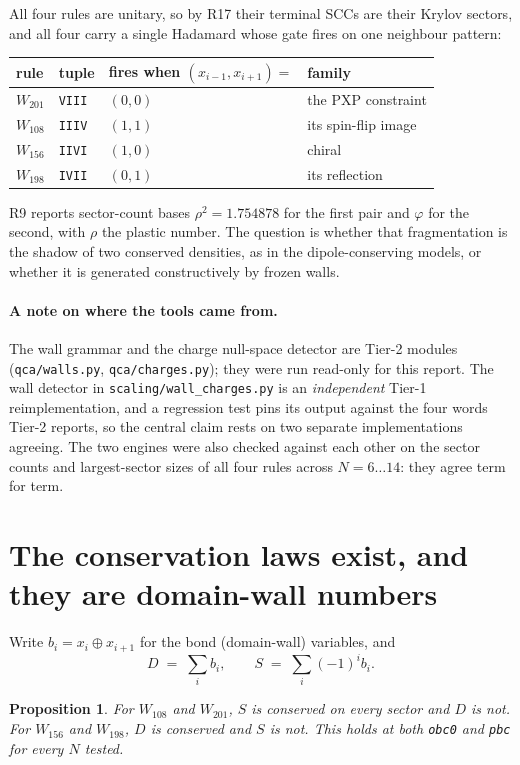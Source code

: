 \documentclass[11pt]{article}
\newcommand{\rt}[1]{\texttt{#1}}
\newcommand{\fn}[1]{\texttt{#1}}
\theoremstyle{plain}
\newtheorem{proposition}{Proposition}
\begin{document}
All four rules are unitary, so by R17 their terminal SCCs are their Krylov
sectors, and all four carry a single Hadamard whose gate fires on one neighbour
pattern:
\begin{center}
\begin{tabular}{llll}
\toprule
rule & tuple & fires when $(x_{i-1},x_{i+1})=$ & family \\
\midrule
$W_{201}$ & \rt{VIII} & $(0,0)$ & the PXP constraint \\
$W_{108}$ & \rt{IIIV} & $(1,1)$ & its spin-flip image \\
$W_{156}$ & \rt{IIVI} & $(1,0)$ & chiral \\
$W_{198}$ & \rt{IVII} & $(0,1)$ & its reflection \\
\bottomrule
\end{tabular}
\end{center}

\noindent R9 reports sector-count bases $\rho^2=1.754878$ for the first pair and
$\varphi$ for the second, with $\rho$ the plastic number. The question is whether
that fragmentation is the shadow of two conserved densities, as in the
dipole-conserving models, or whether it is generated constructively by frozen
walls.

\paragraph{A note on where the tools came from.} The wall grammar and the
charge null-space detector are Tier-2 modules (\fn{qca/walls.py},
\fn{qca/charges.py}); they were run read-only for this report. The wall detector
in \fn{scaling/wall\_charges.py} is an \emph{independent} Tier-1
reimplementation, and a regression test pins its output against the four words
Tier-2 reports, so the central claim rests on two separate implementations
agreeing. The two engines were also checked against each other on the sector
counts and largest-sector sizes of all four rules across $N=6\ldots14$: they
agree term for term.

\section{The conservation laws exist, and they are domain-wall numbers}

Write $b_i = x_i \oplus x_{i+1}$ for the bond (domain-wall) variables, and
\[
D \;=\; \sum_i b_i , \qquad S \;=\; \sum_i (-1)^i b_i .
\]

\begin{proposition}
For $W_{108}$ and $W_{201}$, $S$ is conserved on every sector and $D$ is not.
For $W_{156}$ and $W_{198}$, $D$ is conserved and $S$ is not. This holds at both
\rt{obc0} and \rt{pbc} for every $N$ tested.
\end{proposition}
\end{document}
